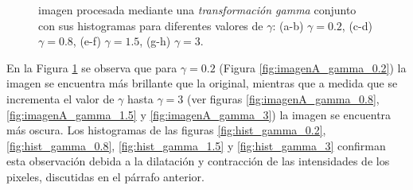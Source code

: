 \documentclass[11pt, twocolumn]{article}
\begin{document}
\begin{figure}[H]
  \hfill
  \hfill
  \hfill
  \hfill
  \hfill
  \caption{imagen procesada mediante una \textit{transformación gamma} conjunto con sus histogramas para diferentes valores de $\gamma$: (a-b) $\gamma = 0.2$, (c-d) $\gamma = 0.8$, (e-f) $\gamma = 1.5$, (g-h) $\gamma = 3$.}
  \label{fig:figuras_ej_2_gamma}
\end{figure}

En la Figura \ref{fig:figuras_ej_2_gamma} se observa que para $\gamma = 0.2$ (Figura \ref{fig:imagenA_gamma_0.2}) la imagen se encuentra más brillante que la original, mientras que a medida que se incrementa el valor de $\gamma$ hasta $\gamma = 3$ (ver figuras \ref{fig:imagenA_gamma_0.8}, \ref{fig:imagenA_gamma_1.5} y \ref{fig:imagenA_gamma_3}) la imagen se encuentra más oscura. Los histogramas de las figuras \ref{fig:hist_gamma_0.2}, \ref{fig:hist_gamma_0.8}, \ref{fig:hist_gamma_1.5} y \ref{fig:hist_gamma_3} confirman esta observación debida a la dilatación y contracción de las intensidades de los pixeles, discutidas en el párrafo anterior.
\end{document}
